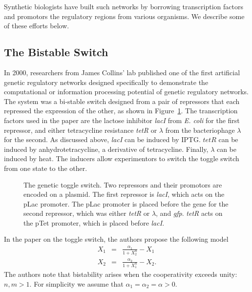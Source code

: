 Synthetic biologists have built such networks by borrowing
transcription factors and promotors the regulatory regions from
various organisms. We describe some of these efforts below.

\subsection{The Bistable Switch}

In 2000, researchers from James Collins' lab published one of the
first artificial genetic regulatory networks designed specifically to
demonstrate the computational or information processing potential of
genetic regulatory networks. The system was a bi-stable switch
\cite{collins-toggle} designed from a pair of repressors that each
repressed the expression of the other, as shown in
Figure~\ref{fig:toggle}. The transcription factors used in the paper
are the lactose inhibitor {\em lacI} from {\em E. coli} for the first
repressor, and either tetracycline resistance {\em tetR} or $\lambda$
from the bacteriophage $\lambda$ for the second. As discussed above,
{\em lacI} can be induced by IPTG. $tetR$ can be induced by
anhydrotetracycline, a derivative of tetracycline. Finally, $\lambda$
can be induced by heat. The inducers allow experimentors to switch the
toggle switch from one state to the other.

\begin{figure}
  \caption{\label{fig:toggle} The genetic toggle switch. Two
    repressors and their promotors are encoded on a plasmid. The first
    repressor is {\em lacI}, which acts on the pLac promoter. The pLac
    promoter is placed before the gene for the second repressor, which
    was either {\em tetR} or $\lambda$, and {\em gfp}. {\em tetR} acts
    on the pTet promoter, which is placed before {\em lacI}.}
\end{figure}

In the paper on the toggle switch, the authors propose the following
model
%
\begin{eqnarray}
X_1 & = & \frac{\alpha_1}{1+X_2^n} - X_1 \nonumber \\
X_2 & = & \frac{\alpha_2}{1+X_1^n} - X_2 . \label{eqn:bistable}
\end{eqnarray}
%
The authors note that bistability arises when the cooperativity
exceeds unity: $n,m>1$. For simplicity we assume that
$\alpha_1=\alpha_2=\alpha>0$.

